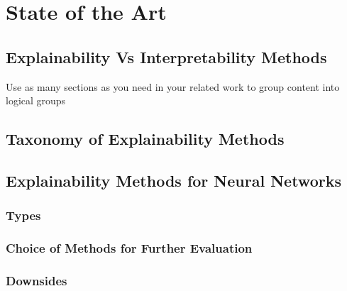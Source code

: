 \documentclass[../report.tex]{subfiles}
\begin{document}
    \chapter{State of the Art}

    \section{Explainability Vs Interpretability Methods}
    Use as many sections as you need in your related work to group content into logical groups
    \section{Taxonomy of Explainability Methods}

    \section{Explainability Methods for Neural Networks}
    \subsection{Types}
    \subsection{Choice of Methods for Further Evaluation}
    \subsection{Downsides}
    
\end{document}
